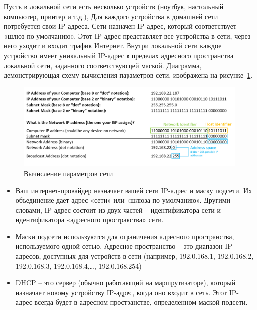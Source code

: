 \documentclass[12pt]{article}
\providecommand{\tightlist}{%
  \setlength{\itemsep}{0pt}\setlength{\parskip}{0pt}}
\begin{document}
Пусть в локальной сети есть несколько устройств (ноутбук, настольный компьютер, принтер
и т.д.), Для каждого устройства в домашней сети потребуется свои
IP-адреса. %
Сети назначен IP-адрес, который соответствует «шлюз по умолчанию». Этот
IP-адрес представляет все устройства в сети, через него уходит и входит
трафик Интернет. Внутри локальной сети каждое устройство имеет
уникальный IP-адрес в пределах адресного пространства локальной сети,
заданного соответствующей маской. %
Диаграмма, демонстрирующая схему вычисления параметров сети, изображена на рисунке~\ref{fig:netparms}.
\begin{figure}[tbh]
  \centering
  \includegraphics[width=0.9\linewidth]{blog/2019/bash-essentials/ipaddresses.PNG}

  \caption{Вычисление параметров сети}
  \label{fig:netparms}
\end{figure}
\begin{itemize}
\tightlist
\item
  Ваш интернет-провайдер назначает вашей сети IP-адрес и маску подсети.
  Их объединение дает адрес «сети» или «шлюза по умолчанию». Другими
  словами, IP-адрес состоит из двух частей -- идентификатора сети и
  идентификатора «адресного пространства» сети.
\item
  Маски подсети используются для ограничения адресного пространства,
  используемого одной сетью. Адресное пространство -- это диапазон
  IP-адресов, доступных для устройств в сети (например, 192.0.168.1,
  192.0.168.2, 192.0.168.3, 192.0.168.4,\ldots, 192.0.168.254)
\item
  DHCP -- это сервер (обычно работающий на маршрутизаторе), который
  назначает новому устройству IP-адрес, когда оно входит в сеть. Этот
  IP-адрес всегда будет в адресном пространстве, определенном маской
  подсети.
\end{itemize}
\end{document}
